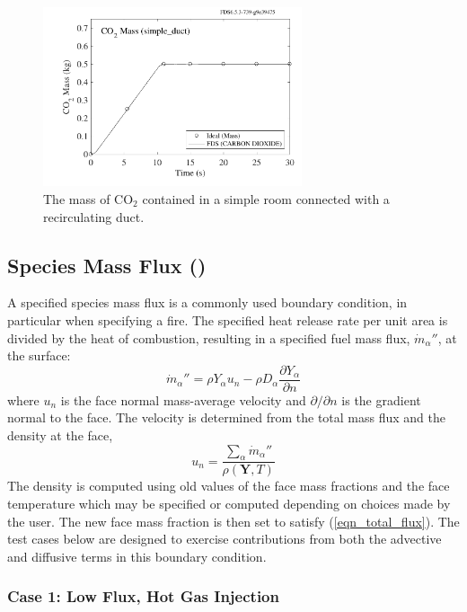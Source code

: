 \documentclass[11pt]{book}
\begin{document}
\begin{figure}[h]
\centering
\includegraphics[width=3in]{SCRIPT_FIGURES/simple_duct_mass}
\caption[The  test case]{The mass of CO$_2$ contained in a simple room connected with a recirculating duct.}
\label{simple_duct}
\end{figure}

\clearpage

\subsection{Species Mass Flux (\texorpdfstring{}{species\_conservation})}

 A specified species mass flux is a commonly used boundary condition, in particular when specifying a fire.  The specified heat release rate per unit area is divided by the heat of combustion, resulting in a specified fuel mass flux, $\dot{m}_\alpha''$, at the surface:
\begin{equation}
\label{eqn_total_flux}
\dot{m}_{\alpha}'' = \rho Y_{\alpha} u_n - \rho D_\alpha \frac{\partial Y_\alpha}{\partial n}
\end{equation}
where $u_n$ is the face normal mass-average velocity and $\partial/\partial n$ is the gradient normal to the face.  The velocity is determined from the total mass flux and the density at the face,
\begin{equation}
\label{eqn_un}
u_n = \frac{\sum_\alpha \dot{m}_\alpha''}{\rho(\mathbf{Y},T)}
\end{equation}
The density is computed using old values of the face mass fractions and the face temperature which may be specified or computed depending on choices made by the user.  The new face mass fraction is then set to satisfy (\ref{eqn_total_flux}).  The test cases below are designed to exercise contributions from both the advective and diffusive terms in this boundary condition.

\subsubsection{Case 1: Low Flux, Hot Gas Injection}
\end{document}
